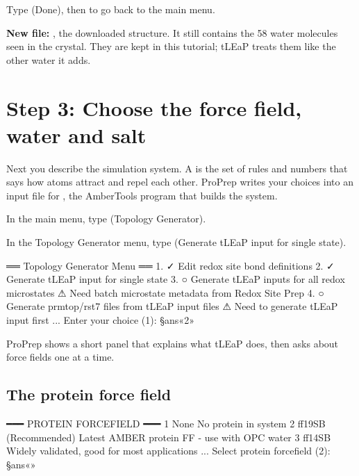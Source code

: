 \begin{steps}[resume]
  \item Type  (Done), then  to go back to the main menu.
\end{steps}

\textbf{New file:} , the downloaded structure. It still
contains the 58 water molecules seen in the crystal. They are kept in this
tutorial; tLEaP treats them like the other water it adds.

\section{Step 3: Choose the force field, water and salt}\label{sec:tutorial-leapin}

Next you describe the simulation system. A  is the set of
rules and numbers that says how atoms attract and repel each other. ProPrep
writes your choices into an input file for , the AmberTools
program that builds the system.

\begin{steps}
  \item In the main menu, type  (Topology Generator).
  \item In the Topology Generator menu, type  (Generate tLEaP input for
        single state).
\end{steps}

\begin{screen}
══ Topology Generator Menu ══
  1. ✓ Edit redox site bond definitions
  2. ✓ Generate tLEaP input for single state
  3. ○ Generate tLEaP inputs for all redox microstates
       ⚠ Need batch microstate metadata from Redox Site Prep
  4. ○ Generate prmtop/rst7 files from tLEaP input files
       ⚠ Need to generate tLEaP input first
...
Enter your choice (1): §ans«2»
\end{screen}

ProPrep shows a short panel that explains what tLEaP does, then asks about
force fields one at a time.

\subsection{The protein force field}

\begin{screen}
━━━ PROTEIN FORCEFIELD ━━━
  1     None                          No protein in system
  2     ff19SB (Recommended)          Latest AMBER protein FF - use with OPC water
  3     ff14SB                        Widely validated, good for most applications
...
Select protein forcefield (2): §ans«»
\end{screen}

